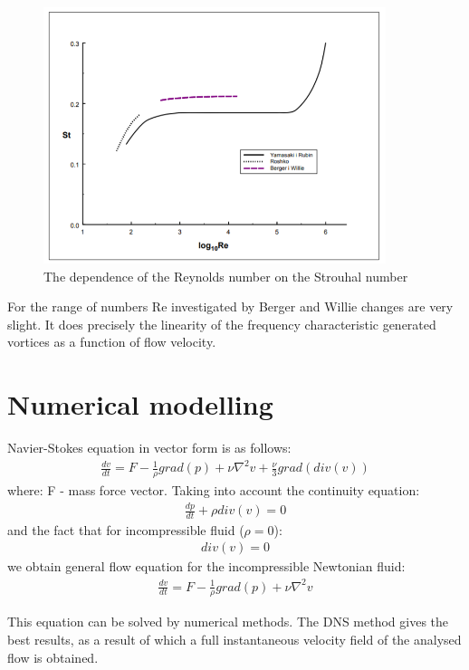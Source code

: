 \documentclass[a4paper,11pt]{article}
\begin{document}
\begin{figure}[h]
\centering
\includegraphics[width=10cm]{strouhal.PNG}
\caption{The dependence of the Reynolds number on the Strouhal number}
\end{figure}

For the range of numbers Re investigated by Berger and Willie changes are very slight. It does
precisely the linearity of the frequency characteristic generated vortices as a function of flow velocity.

\section{Numerical modelling}

Navier-Stokes equation in vector form is as follows:
\begin{gather*}
    \frac{dv}{dt} = F - \frac{1}{\rho}grad(p)+\nu\nabla^2v+\frac{\nu}{3}grad(div(v))
\end{gather*} 
\noindent where: F - mass force vector.
\medskip
Taking into account the continuity equation:
\begin{gather*}
    \frac{dp}{dt} + \rho div(v) = 0
\end{gather*}
and the fact that for incompressible fluid ($\rho=0$):
\begin{gather*}
    div(v) = 0
\end{gather*}
we obtain general flow equation for the incompressible
Newtonian fluid:
\begin{gather*}
    \frac{dv}{dt} = F - \frac{1}{\rho}grad(p)+\nu\nabla^2v
\end{gather*}

\noindent This equation can be solved by numerical methods. The DNS method gives the best results, as a result of which a full instantaneous velocity field of the analysed flow is obtained.
\end{document}

